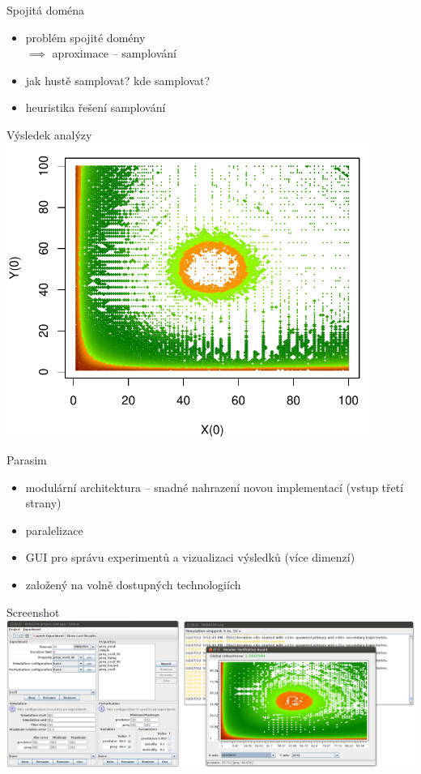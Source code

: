 \documentclass[xcolor=svgnames,14pt]{beamer}
\begin{document}
\begin{frame}{Spojitá doména}
	\begin{itemize}
		\item problém spojité domény\\$\implies$ aproximace -- samplování
		\item jak hustě samplovat? kde samplovat?
		\item heuristika řešení samplování
	\end{itemize}
\end{frame}

\begin{frame}{Výsledek analýzy}
	\centering\includegraphics[width=0.9\textwidth]{lotkav-analysis.pdf}
\end{frame}

\begin{frame}{Parasim}
	\begin{itemize}
		\item modulární architektura -- snadné nahrazení novou implementací (vstup třetí strany)
		\item paralelizace
		\item GUI pro správu experimentů a vizualizaci výsledků (více dimenzí)
		\item založený na volně dostupných technologiích
	\end{itemize}
\end{frame}

\begin{frame}{Screenshot}
	\centering\includegraphics[width=\textwidth]{../screenshots/parasim.png}
\end{frame}
\end{document}
